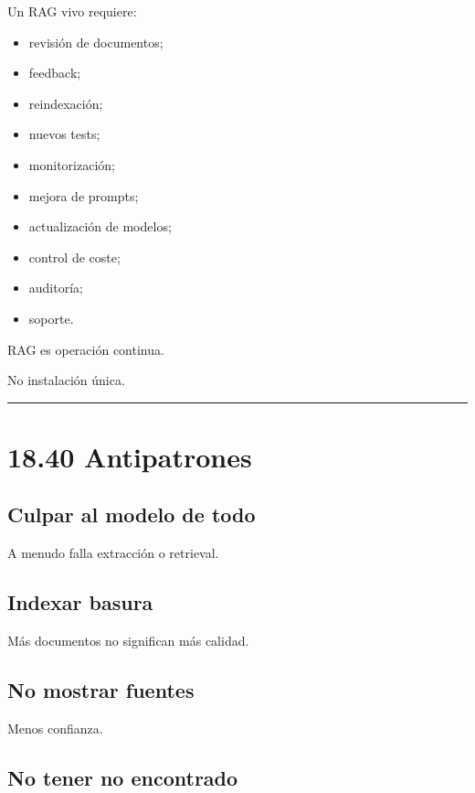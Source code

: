 Un RAG vivo requiere:

\begin{itemize}
\tightlist
\item
  revisión de documentos;
\item
  feedback;
\item
  reindexación;
\item
  nuevos tests;
\item
  monitorización;
\item
  mejora de prompts;
\item
  actualización de modelos;
\item
  control de coste;
\item
  auditoría;
\item
  soporte.
\end{itemize}

RAG es operación continua.

No instalación única.

\begin{center}\rule{0.5\linewidth}{0.5pt}\end{center}

\section{18.40 Antipatrones}\label{antipatrones-7}

\subsection{Culpar al modelo de todo}\label{culpar-al-modelo-de-todo}

A menudo falla extracción o retrieval.

\subsection{Indexar basura}\label{indexar-basura}

Más documentos no significan más calidad.

\subsection{No mostrar fuentes}\label{no-mostrar-fuentes}

Menos confianza.

\subsection{No tener no encontrado}\label{no-tener-no-encontrado}

